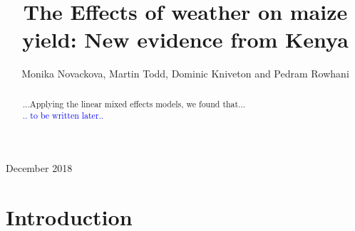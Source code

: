 \documentclass[12pt]{iopart}
\begin{document}
\submitto{\ERL}

\title{The Effects of weather on maize yield: New evidence from Kenya}

\author{Monika Novackova, Martin Todd, Dominic Kniveton and Pedram Rowhani}

\address{Department of Geography, University of Sussex, Falmer, UK}
\vspace{10pt}
\begin{indented}
\item[]December 2018
\end{indented}

\doublespacing
\begin{abstract}
...Applying the linear mixed effects models, we found that...\\
\textcolor{blue}{.. to be written later..}
\end{abstract}

%
%
%
% 
%
\maketitle
\section{Introduction}\label{Introduction}
\end{document}
